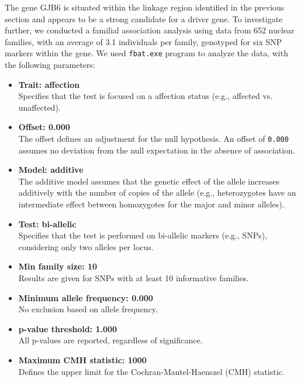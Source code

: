 \documentclass[a4paper,12pt]{article}
\begin{document}
The gene GJB6 is situated within the linkage region identified in the previous section and appears to be a strong 
candidate for a driver gene. To investigate further, we conducted a familial association analysis using data from 
652 nuclear families, with an average of 3.1 individuals per family, genotyped for six SNP markers within the gene. 
We used \texttt{fbat.exe} program to analyze the data, with the following parameters:
\begin{itemize}
    \item \textbf{Trait: affection} \\
    Specifies that the test is focused on a affection status (e.g., affected vs. unaffected).
    
    \item \textbf{Offset: 0.000} \\
    The offset defines an adjustment for the null hypothesis. An offset of \texttt{0.000} assumes no deviation from 
    the null expectation in the absence of association.
    
    \item \textbf{Model: additive} \\
    The additive model assumes that the genetic effect of the allele increases additively with the number of copies 
    of the allele (e.g., heterozygotes have an intermediate effect between homozygotes for the major and minor alleles).
    
    \item \textbf{Test: bi-allelic} \\
    Specifies that the test is performed on bi-allelic markers (e.g., SNPs), considering only two alleles per locus.
    
    \item \textbf{Min family size: 10} \\
    Results are given for SNPs with at least 10 informative families.
    
    \item \textbf{Minimum allele frequency: 0.000} \\
    No exclusion based on allele frequency.
    
    \item \textbf{p-value threshold: 1.000} \\
    All p-values are reported, regardless of significance.
    
    \item \textbf{Maximum CMH statistic: 1000} \\
    Defines the upper limit for the Cochran-Mantel-Haenszel (CMH) statistic.
\end{itemize}
\end{document}
